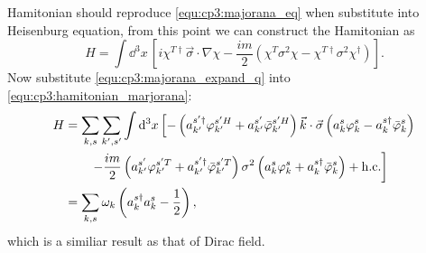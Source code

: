 \begin{problembody}
    Hamitonian should reproduce \eqref{equ:cp3:majorana_eq} when substitute into Heisenburg equation, from this point we can construct the Hamitonian as
    \begin{equation}\label{equ:cp3:hamitonian_marjorana}
        H = \int \dd^3x \, \left[
            i\chi^{T\dagger} \vec{\sigma}\cdot\nabla\chi 
            - \frac{im}{2}\left(
                \chi^T\sigma^2\chi 
                - \chi^{T\dagger}\sigma^2\chi^\dagger
            \right)
        \right].
    \end{equation}
    Now substitute \eqref{equ:cp3:majorana_expand_q} into \eqref{equ:cp3:hamitonian_marjorana}:
    \begin{align*}
        H & = \sum_{k, s}\sum_{k', s'} \int \mathrm{d}^3x \left[
            -\left(a_{k'}^{s'\dagger}\varphi_{k'}^{s'H} + a_{k'}^{s'}\bar{\varphi}_{k'}^{s'H}\right)
            \vec{k}\cdot\vec{\sigma}
            \left(a_k^s\varphi_k^s - a_k^{s\dagger}\bar{\varphi}_k^s\right)
            \right.\\
            &\qquad \left. -\frac{im}{2} 
            \left(a_{k'}^{s'}\varphi_{k'}^{s'T} + a_{k'}^{s'\dagger}\bar{\varphi}_{k'}^{s'T}\right)
            \sigma^2
            \left(a_k^s\varphi_k^s + a_k^{s\dagger}\bar{\varphi}_k^s\right) + \mathrm{h.c.}
        \right]\\
        & = \sum_{k, s} \omega_k \left(a_k^{s\dagger}a_k^s - \frac{1}{2}\right),
    \end{align*}
    which is a similiar result as that of Dirac field.
\end{problembody}

